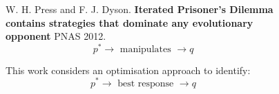 \documentclass[usenames,dvipsnames,t]{beamer}
\newcommand{\R}{\mathbb{R}}
\begin{document}
\begin{columns}
    \begin{column}{.05\linewidth}
    \end{column}
    \begin{column}{.2\linewidth}
        \vspace{3cm}

        
    \end{column}
    \begin{column}{.3\linewidth}
    \vspace{-.5cm}
        \begin{center}
             \\
             \\
            
        \end{center}
    \end{column}
    \begin{column}{.1\linewidth}
        \vspace{2cm}

        
    \end{column}
    \begin{column}{.3\linewidth}
        \vspace{1cm}

        \small{
            W. H. Press and F. J. Dyson. \textbf{Iterated Prisoner's
            Dilemma contains strategies that dominate any evolutionary opponent}
            PNAS 2012.%
            \[p ^ * \rightarrow \text{ manipulates } \rightarrow q\]
        }
        \vspace{1cm}

        \small{
        This work considers an optimisation approach to identify:
        \[ p ^ * \rightarrow \text{ best response } \rightarrow q\]}
        \normalsize{{
            \boldmath{\[u_q(p)= \frac{\frac{1}{2}\enspace p  Q  p^T + c^T p + a}
                  {\frac{1}{2}\enspace  p  \bar{Q}  p^T + \bar{c}^T  p + \bar{a}},\] \\
                  \[\text{where }  \ p \in \R^4_{[0, 1]}\]
            }}}
    \end{column}
    \begin{column}{.05\linewidth}
    \end{column}
\end{columns}
\vspace{1cm}
\end{document}
